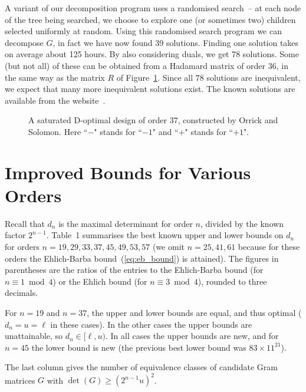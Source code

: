 \documentclass[11pt,a4paper]{article}
\begin{document}
A variant of our decomposition program uses a randomised search~-- at each
node of the tree being searched, we choose to explore one (or sometimes two) 
children selected uniformly at random.
Using this randomised search program we can decompose $G$, 
in fact we have now found 39 solutions. Finding one solution
takes on average about 125 hours. By also considering duals, %
we get 78 solutions.
Some (but not all) of these can be obtained from a Hadamard
matrix of order $36$, in the same way as 
the matrix $R$ of Figure~\ref{fig:design37}.
Since all $78$ solutions are inequivalent,
we expect that many more inequivalent solutions exist.
The known solutions are available from the website~\cite{www37}.

\begin{center}
\begin{figure}[htp]

\caption{A saturated D-optimal design of order $37$,
constructed by Orrick and Solomon.  
Here ``$-$" stands for ``$-1$" and ``$+$" stands for ``$+1$".}
\label{fig:design37}
\end{figure}
\end{center}

\section{Improved Bounds for Various Orders} \label{sec:other_bounds}

Recall that $d_n$ is the maximal determinant for order $n$, divided by
the known factor $2^{n-1}$.
Table~1 summarises the best known upper and lower bounds on $d_n$
for orders $n = 19, 29, 33, 37, 45, 49, 53, 57$
(we omit \hbox{$n = 25, 41, 61$} 
because for these orders
the Ehlich-Barba bound~(\ref{eq:eb_bound})
is attained). 
The figures in parentheses are the ratios of
the entries to the 
Ehlich-Barba bound
(for $n \equiv 1 \bmod 4$)
or the Ehlich bound 
(for $n \equiv 3 \bmod 4$),
rounded to three decimals.

For $n = 19$ and $n = 37$, the upper and lower bounds are equal, and thus
optimal ($d_n = u = \ell$ in these cases).
In the other cases the upper bounds are unattainable, so $d_n \in [\ell, u)$.
In all cases the upper bounds are new, and for $n=45$ the lower bound is
new (the previous best lower bound was $83 \times 11^{21}$).

The last column gives the number of equivalence classes of candidate
Gram matrices $G$ with $\det(G) \ge (2^{n-1}u)^2$. 
\end{document}
